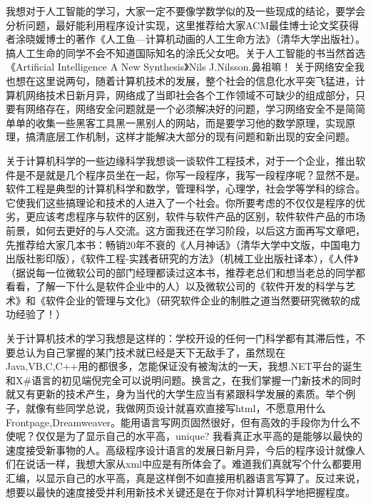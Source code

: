 我想对于人工智能的学习，大家一定不要像学数学似的及一些现成的结论，要学会分析问题，最好能利用程序设计实现，这里推荐给大家ACM最佳博士论文奖获得者涂晓媛博士的著作《人工鱼—计算机动画的人工生命方法》（清华大学出版社）。搞人工生命的同学不会不知道国际知名的涂氏父女吧。关于人工智能的书当然首选《Artificial Intelligence A New Synthesis》Nils J.Nilsson.鼻祖嘛！
关于网络安全我也想在这里说两句，随着计算机技术的发展，整个社会的信息化水平突飞猛进，计算机网络技术日新月异，网络成了当即社会各个工作领域不可缺少的组成部分，只要有网络存在，网络安全问题就是一个必须解决好的问题，学习网络安全不是简简单单的收集一些黑客工具黑一黑别人的网站，而是要学习他的数学原理，实现原理，搞清底层工作机制，这样才能解决大部分的现有问题和新出现的安全问题。

关于计算机科学的一些边缘科学我想谈一谈软件工程技术，对于一个企业，推出软件是不是就是几个程序员坐在一起，你写一段程序，我写一段程序呢？显然不是。软件工程是典型的计算机科学和数学，管理科学，心理学，社会学等学科的综合。它使我们这些搞理论和技术的人进入了一个社会。你所要考虑的不仅仅是程序的优劣，更应该考虑程序与软件的区别，软件与软件产品的区别，软件软件产品的市场前景，如何去更好的与人交流。这方面我还在学习阶段，以后这方面再写文章吧，先推荐给大家几本书：畅销20年不衰的《人月神话》（清华大学中文版，中国电力出版社影印版），《软件工程-实践者研究的方法》（机械工业出版社译本），《人件》（据说每一位微软公司的部门经理都读过这本书，推荐老总们和想当老总的同学都看看，了解一下什么是软件企业中的人）以及微软公司的《软件开发的科学与艺术》和《软件企业的管理与文化》（研究软件企业的制胜之道当然要研究微软的成功经验了！）

关于计算机技术的学习我想是这样的：学校开设的任何一门科学都有其滞后性，不要总认为自己掌握的某门技术就已经是天下无敌手了，虽然现在Java,VB,C,C++用的都很多，怎能保证没有被淘汰的一天，我想.NET平台的诞生和X\#语言的初见端倪完全可以说明问题。换言之，在我们掌握一门新技术的同时就又有更新的技术产生，身为当代的大学生应当有紧跟科学发展的素质。举个例子，就像有些同学总说，我做网页设计就喜欢直接写html，不愿意用什么Frontpage,Dreamweaver。能用语言写网页固然很好，但有高效的手段你为什么不使呢？仅仅是为了显示自己的水平高，unique? 我看真正水平高的是能够以最快的速度接受新事物的人。高级程序设计语言的发展日新月异，今后的程序设计就像人们在说话一样，我想大家从xml中应是有所体会了。难道我们真就写个什么都要用汇编，以显示自己的水平高，真是这样倒不如直接用机器语言写算了。反过来说，想要以最快的速度接受并利用新技术关键还是在于你对计算机科学地把握程度。

